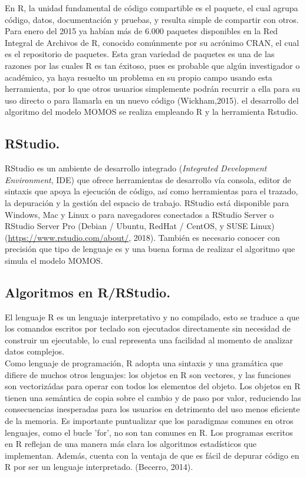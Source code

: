 En R, la unidad fundamental de c\'odigo compartible es el paquete, el cual agrupa c\'odigo, datos, documentaci\'on y pruebas, y resulta simple de compartir con otros. Para enero del 2015 ya hab\'ian m\'as de 6.000 paquetes disponibles en la Red Integral de Archivos de R, conocido com\'unmente por su acr\'onimo CRAN, el cual es el repositorio de paquetes. Esta gran variedad de paquetes es una de las razones por las cuales R es tan \'exitoso, pues es probable que alg\'un investigador o acad\'emico, ya haya resuelto un problema en su propio campo usando esta herramienta, por lo que otros usuarios simplemente podr\'an recurrir a ella para su uso directo o para llamarla en un nuevo c\'odigo (Wickham,2015). el desarrollo del algoritmo del modelo MOMOS se realiza empleando R y la herramienta Rstudio. \\


\subsection{RStudio.}

RStudio es un ambiente de desarrollo integrado (\textit{Integrated Development Environment}, IDE) que ofrece herramientas de desarrollo vía consola, editor de sintaxis que apoya la ejecución de código, así como herramientas para el trazado, la depuración y la gestión del espacio de trabajo.  RStudio está disponible para Windows, Mac y Linux o para navegadores conectados a RStudio Server o RStudio Server Pro (Debian / Ubuntu, RedHat / CentOS, y SUSE Linux) (\url{https://www.rstudio.com/about/}, 2018). Tambi\'en es necesario conocer con precisi\'on que tipo de lenguaje es y una buena forma de realizar el algoritmo que simula el modelo MOMOS.\\
 
 \subsection{Algoritmos en R/RStudio.}
 
El lenguaje R es un lenguaje interpretativo y no compilado, esto se traduce a que los comandos escritos por teclado son ejecutados directamente sin necesidad de construir un ejecutable, lo cual representa una facilidad al momento de analizar datos complejos. \\

Como lenguaje de programación, R adopta una sintaxis y una gramática que difiere de muchos otros lenguajes: los objetos en R son vectores, y las funciones son vectorizádas para operar con todos los elementos del objeto. Los objetos en R tienen una semántica de copia sobre el cambio y de paso por valor, reduciendo las consecuencias inesperadas para los usuarios en detrimento del uso menos eficiente de la memoria. Es importante puntualizar que los paradigmas comunes en otros lenguajes, como el bucle ’for’, no son tan comunes en R. Los programas escritos en R reflejan de una manera más clara los algoritmos estadísticos que implementan. Además, cuenta con la ventaja de que es fácil de depurar código en R por ser un lenguaje interpretado. (Becerro, 2014).\\

